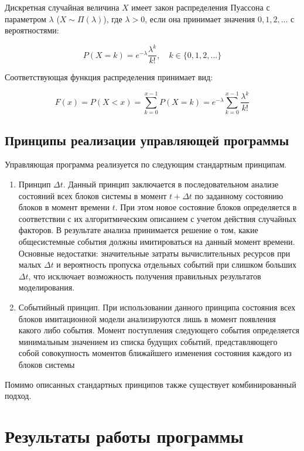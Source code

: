 \documentclass[14pt, a4paper]{extarticle}
\begin{document}
Дискретная случайная величина $X$ имеет закон распределения Пуассона с параметром $\lambda$ ($X \sim \Pi(\lambda)$), где $\lambda > 0$, если она принимает значения $0, 1, 2,...$ с вероятностями:

\begin{equation}
	P(X = k)= e^{-\lambda}\frac{\lambda^{k}}{k!}, \quad k \in \{0, 1, 2, ...\}
\end{equation}

Соответствующая функция распределения принимает вид:

\begin{equation}
	F(x) = P(X < x) = \sum_{k=0}^{x-1}P(X = k) = e^{-\lambda}\sum_{k=0}^{x-1}\frac{\lambda^{k}}{k!} 
\end{equation}

\subsection{Принципы реализации управляющей программы}

Управляющая программа реализуется по следующим стандартным принципам.

\begin{enumerate}
	\item Принцип $\Delta t$. Данный принцип заключается в последовательном анализе состояний всех блоков системы в момент $t + \Delta t$ по заданному состоянию блоков в момент времени $t$. При этом новое состояние блоков определяется в соответствии с их алгоритмическим описанием с учетом действия случайных факторов. В результате анализа принимается решение о том, какие общесистемные события  должны имитироваться на данный момент времени. Основные недостатки: значительные затраты вычислительных ресурсов при малых $\Delta t$ и вероятность пропуска отдельных событий при слишком больших
$\Delta t$, что исключает возможность получения правильных результатов моделирования.
	\item Событийный принцип. При использовании данного принципа состояния всех блоков имитационной модели анализируются лишь в момент появления какого либо события. Момент поступления следующего события определяется минимальным значением из списка будущих событий, представляющего собой совокупность моментов ближайшего изменения состояния каждого из блоков системы
\end{enumerate}

Помимо описанных стандартных принципов также существует комбинированный подход.


\section{Результаты работы программы}
\end{document}
